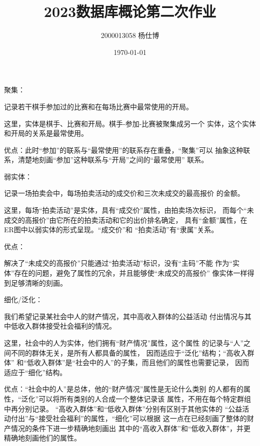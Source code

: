 \documentclass[UTF8]{ctexart}
\title{\vspace{-4cm}2023数据库概论第二次作业}
\author{2000013058 杨仕博}
\date{\today}
\begin{document}
\maketitle

\subsection{}

聚集：

记录若干棋手参加过的比赛和在每场比赛中最常使用的开局。

这里，实体是棋手、比赛和开局。棋手-参加-比赛被聚集成另一个
实体，这个实体和开局的关系是最常使用。

优点：此时“参加”的联系与“最常使用”的联系存在重叠，“聚集”可以
抽象这种联系，清楚地刻画“参加”这种联系与“开局”之间的“最常使用”
联系。

弱实体：

记录一场拍卖会中，每场拍卖活动的成交价和三次未成交的最高报价
的金额。

这里，每场“拍卖活动”是实体，具有“成交价”属性，由拍卖场次标识，
而每个“未成交的高报价”由它所在的拍卖活动和它的出价排名确定，
具有“金额”属性，在ER图中以弱实体的形式呈现。“成交价”和
“拍卖活动”有“隶属”关系。

优点：

解决了“未成交的高报价”只能通过“拍卖活动”标识，没有“主码”不能
作为“实体”存在的问题，避免了属性的冗余，并且能够使“未成交的高报价”
像实体一样得到足够清晰的刻画。

细化/泛化：

我们希望记录某社会中人的财产情况，其中高收入群体的公益活动
付出情况与其中低收入群体接受社会福利的情况。

这里，社会中的人为实体，他们拥有“财产情况”属性，这个属性
的记录与“人”之间不同的群体无关，是所有人都具备的属性，
因而适应于“泛化”结构；“高收入群体”
和“低收入群体”是“社会中的人”的子集，而且他们的属性也需要记录，
因而适应于“细化”结构。

优点：“社会中的人”是总体，他的“财产情况”属性是无论什么类别
的人都有的属性，“泛化”可以将所有类别的人合成一个整体记录该
属性，不用在每个特定群组中再分别记录。
“高收入群体”和“低收入群体”分别有区别于其他实体的
“公益活动付出”与“接受社会福利”的属性，“细化”可以根据
这一点在已经刻画了整体的财产情况的条件下进一步精确地刻画出
其中的“高收入群体”和“低收入群体”，并更精确地刻画他们的属性。

\subsection{}
\end{document}
